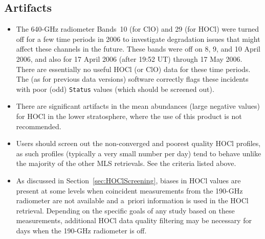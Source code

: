 \subsection{Artifacts}
\begin{itemize}
  \item The 640\nobreakdash-GHz radiometer Bands~10 (for ClO) and 29 (for HOCl) were turned off for a few time periods in 2006 to investigate degradation issues that might affect these channels in the future. These bands were off on 8, 9, and 10 April 2006, and also for 17 April 2006 (after 19:52 UT) through 17 May 2006. There are essentially no useful HOCl (or ClO) data for these time periods. The \thisv (as for previous data versions) software correctly flags these incidents with poor (odd) \texttt{Status} values (which should be screened out).
  \item There are significant artifacts in the mean abundances (large negative values) for HOCl in the lower stratosphere, where the use of this product is not recommended.
  \item Users should screen out the non-converged and poorest quality HOCl profiles, as such profiles (typically a very small number per day) tend to behave unlike the majority of the other MLS retrievals. See the criteria listed above.
  \item As discussed in Section~\ref{sec:HOClScreening}, biases in HOCl values are present at some levels when coincident measurements from the \mbox{190-GHz} radiometer are not available and  a~priori information is used in the HOCl retrieval. Depending on the specific goals of any study based on these measurements, additional HOCl data quality filtering may be necessary for days when the \mbox{190-GHz} radiometer is off.
\end{itemize}


